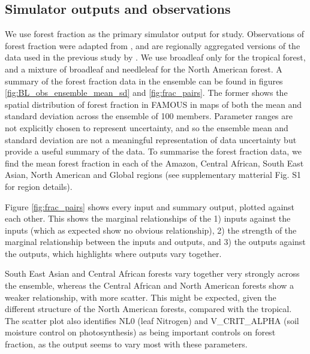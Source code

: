 \documentclass[esd, article]{copernicus} %
\begin{document}
\subsection{Simulator outputs and observations}\label{inputsoutputs}
We use forest fraction as the primary simulator output for study. Observations of forest fraction were adapted from \cite{loveland2000landcover}, and are regionally aggregated versions of the data used in the previous study by \cite{williams2013optimising}. We use broadleaf only for the tropical forest, and a mixture of broadleaf and needleleaf for the North American forest. A summary of the forest fraction data in the ensemble can be found in figures \ref{fig:BL_obs_ensemble_mean_sd} and \ref{fig:frac_pairs}.  The former shows the spatial distribution of forest fraction in FAMOUS in maps of both the mean and standard deviation across the ensemble of 100 members. Parameter ranges are not explicitly chosen to represent uncertainty, and so the ensemble mean and standard deviation are not a meaningful representation of data uncertainty but provide a useful summary of the data. To summarise the forest fraction data, we find the mean forest fraction in each of the Amazon, Central African, South East Asian, North American and Global regions (see supplementary matterial Fig. S1 for region details).

%

Figure \ref{fig:frac_pairs} shows every input and summary output, plotted against each other. This shows the marginal relationships of the 1) inputs against the inputs (which as expected show no obvious relationship), 2) the strength of the marginal relationship between the inputs and outputs, and 3) the outputs against the outputs, which highlights where outputs vary together.



South East Asian and Central African forests vary together very strongly across the ensemble, whereas the Central African and North American forests show a weaker relationship, with more scatter. This might be expected, given the different structure of the North American forests, compared with the tropical. The scatter plot also identifies NL0 (leaf Nitrogen) and V\_CRIT\_ALPHA (soil moisture control on photosynthesis) as being important controls on forest fraction, as the output seems to vary most with these parameters.
\end{document}
